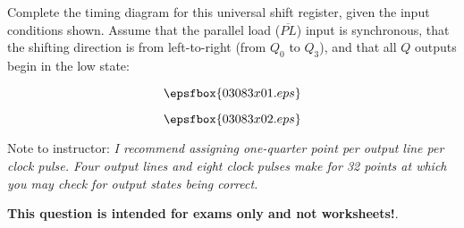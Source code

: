 

Complete the timing diagram for this universal shift register, given the input conditions shown.  Assume that the parallel load ($\overline{PL}$) input is synchronous, that the shifting direction is from left-to-right (from $Q_0$ to $Q_3$), and that all $Q$ outputs begin in the low state:

$$\epsfbox{03083x01.eps}$$







$$\epsfbox{03083x02.eps}$$

Note to instructor: {\it I recommend assigning one-quarter point per output line per clock pulse.  Four output lines and eight clock pulses make for 32 points at which you may check for output states being correct.}







{\bf This question is intended for exams only and not worksheets!}.




